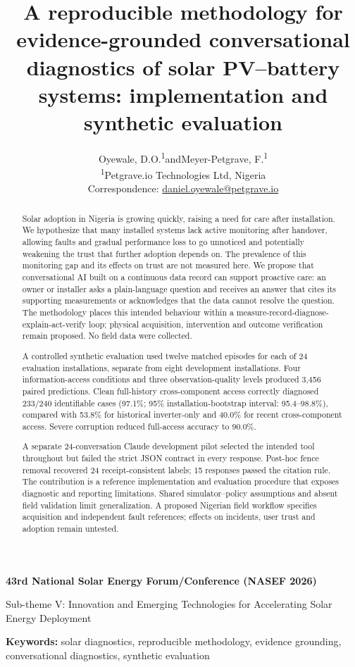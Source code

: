 \documentclass[11pt,a4paper]{article}
\title{\bfseries A reproducible methodology for evidence-grounded conversational diagnostics of solar PV--battery systems: implementation and synthetic evaluation}
\author{Oyewale, D.O.\textsuperscript{1}\quad and\quad Meyer-Petgrave, F.\textsuperscript{1}\\[5pt]
\small \textsuperscript{1}Petgrave.io Technologies Ltd, Nigeria\\
\small Correspondence: \href{mailto:daniel.oyewale@petgrave.io}{daniel.oyewale@petgrave.io}}
\date{}
\begin{document}
\maketitle\thispagestyle{plain}
\begin{center}
{\small\bfseries 43rd National Solar Energy Forum/Conference (NASEF 2026)\par}
\vspace{3pt}
{\small Sub-theme V: Innovation and Emerging Technologies for Accelerating Solar Energy Deployment\par}
\end{center}
\begin{abstract}
Solar adoption in Nigeria is growing quickly, raising a need for care after installation. We hypothesize that many installed systems lack active monitoring after handover, allowing faults and gradual performance loss to go unnoticed and potentially weakening the trust that further adoption depends on. The prevalence of this monitoring gap and its effects on trust are not measured here. We propose that conversational AI built on a continuous data record can support proactive care: an owner or installer asks a plain-language question and receives an answer that cites its supporting measurements or acknowledges that the data cannot resolve the question. The methodology places this intended behaviour within a measure-record-diagnose-explain-act-verify loop; physical acquisition, intervention and outcome verification remain proposed. No field data were collected.

A controlled synthetic evaluation used twelve matched episodes for each of 24 evaluation installations, separate from eight development installations. Four information-access conditions and three observation-quality levels produced 3,456 paired predictions. Clean full-history cross-component access correctly diagnosed 233/240 identifiable cases (97.1\%; 95\% installation-bootstrap interval: 95.4--98.8\%), compared with 53.8\% for historical inverter-only and 40.0\% for recent cross-component access. Severe corruption reduced full-access accuracy to 90.0\%.

A separate 24-conversation Claude development pilot selected the intended tool throughout but failed the strict JSON contract in every response. Post-hoc fence removal recovered 24 receipt-consistent labels; 15 responses passed the citation rule. The contribution is a reference implementation and evaluation procedure that exposes diagnostic and reporting limitations. Shared simulator--policy assumptions and absent field validation limit generalization. A proposed Nigerian field workflow specifies acquisition and independent fault references; effects on incidents, user trust and adoption remain untested.
\end{abstract}
\noindent\textbf{Keywords:} solar diagnostics, reproducible methodology, evidence grounding, conversational diagnostics, synthetic evaluation
\clearpage
\renewcommand{\contentsname}{Table of contents}
\tableofcontents
\clearpage
{}
\listoffigures
\medskip
{}
\listoftables
\clearpage
\end{document}

